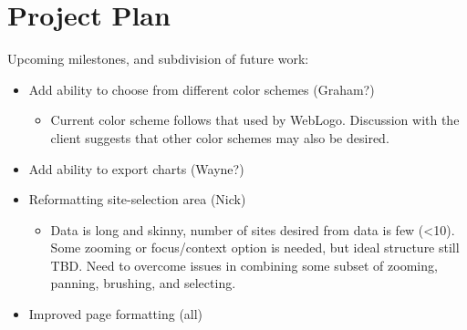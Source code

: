 \documentclass{article}
\begin{document}
\section{Project Plan}

Upcoming milestones, and subdivision of future work:
\begin{itemize}
  \item Add ability to choose from different color schemes (Graham?)
  	\begin{itemize}
	  \item Current color scheme follows that used by WebLogo. Discussion with the client suggests that other color schemes may also be desired.
	\end{itemize}
  \item Add ability to export charts (Wayne?)
  \item Reformatting site-selection area (Nick)
	\begin{itemize}
	  \item Data is long and skinny, number of sites desired from data is few (<10). Some zooming or focus/context option is needed, but ideal structure still TBD.
	  		Need to overcome issues in combining some subset of zooming, panning, brushing, and selecting.
	\end{itemize}
  \item Improved page formatting (all)
\end{itemize}
\end{document}
